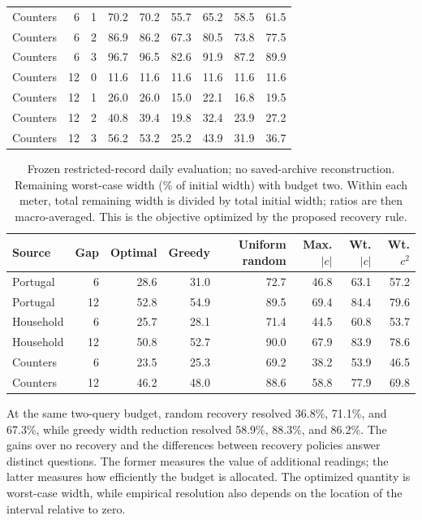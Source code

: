 \documentclass[12pt]{article}
\begin{document}
\begin{table}[htbp]
\begin{tabular}{lrrrrrrrr}
Counters & 6 & 1 & 70.2 & 70.2 & 55.7 & 65.2 & 58.5 & 61.5\\
Counters & 6 & 2 & 86.9 & 86.2 & 67.3 & 80.5 & 73.8 & 77.5\\
Counters & 6 & 3 & 96.7 & 96.5 & 82.6 & 91.9 & 87.2 & 89.9\\
Counters & 12 & 0 & 11.6 & 11.6 & 11.6 & 11.6 & 11.6 & 11.6\\
Counters & 12 & 1 & 26.0 & 26.0 & 15.0 & 22.1 & 16.8 & 19.5\\
Counters & 12 & 2 & 40.8 & 39.4 & 19.8 & 32.4 & 23.9 & 27.2\\
Counters & 12 & 3 & 56.2 & 53.2 & 25.2 & 43.9 & 31.9 & 36.7\\
\bottomrule
\end{tabular}
\end{table}
\begin{table}[htbp]
\centering\normalsize\setlength{\tabcolsep}{4pt}
\caption{Frozen restricted-record daily evaluation; no saved-archive reconstruction. Remaining worst-case width (\% of initial width) with budget two. Within each meter, total remaining width is divided by total initial width; ratios are then macro-averaged. This is the objective optimized by the proposed recovery rule.}
\label{tab:width}
\begin{tabular}{lrrrrrrr}
\toprule
Source & Gap & Optimal & Greedy & Uniform random & Max. $|c|$ & Wt. $|c|$ & Wt. $c^2$\\
\midrule
Portugal & 6 & 28.6 & 31.0 & 72.7 & 46.8 & 63.1 & 57.2\\
Portugal & 12 & 52.8 & 54.9 & 89.5 & 69.4 & 84.4 & 79.6\\
Household & 6 & 25.7 & 28.1 & 71.4 & 44.5 & 60.8 & 53.7\\
Household & 12 & 50.8 & 52.7 & 90.0 & 67.9 & 83.9 & 78.6\\
Counters & 6 & 23.5 & 25.3 & 69.2 & 38.2 & 53.9 & 46.5\\
Counters & 12 & 46.2 & 48.0 & 88.6 & 58.8 & 77.9 & 69.8\\
\bottomrule
\end{tabular}
\end{table}

At the same two-query budget, random recovery resolved
36.8\%, 71.1\%, and 67.3\%, while greedy
width reduction resolved 58.9\%, 88.3\%, and 86.2\%.
The gains over no recovery and the differences between recovery policies
answer distinct questions. The former measures the value of additional
readings; the latter measures how efficiently the budget is allocated.
The optimized quantity is worst-case width, while empirical resolution
also depends on the location of the interval relative to zero.
\end{document}
